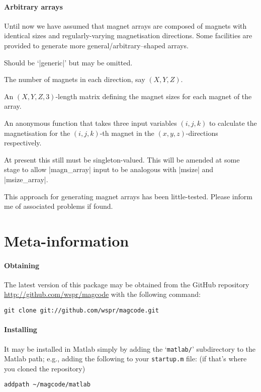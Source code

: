 \documentclass{article}
\begin{document}
\paragraph{Arbitrary arrays}
Until now we have assumed that magnet arrays are composed of magnets with identical sizes and regularly-varying magnetisation directions.
Some facilities are provided to generate more general/arbitrary--shaped arrays.
\begin{description}[noitemsep,font=\ttfamily]
\item[array.type] Should be `|generic|' but may be omitted.
\item[array.mcount] The number of magnets in each direction, say $(X,Y,Z)$.
\item[array.msize_array] An $(X,Y,Z,3)$-length matrix defining the magnet sizes for each magnet of the array.
\item[array.magdir_fn] An anonymous function that takes three input variables $(i,j,k)$ to calculate the magnetisation for the $(i,j,k)$-th magnet in the $(x,y,z)$-directions respectively.
\item[array.magn] At present this still must be singleton-valued. This will be amended at some stage to allow |magn_array| input to be analogous with |msize| and |msize_array|.
\end{description}
This approach for generating magnet arrays has been little-tested. Please inform me of associated problems if found.


\section{Meta-information}\label{meta}

\paragraph{Obtaining}
The latest version of this package may be obtained from the GitHub repository
\url{http://github.com/wspr/magcode} with the following command:
\begin{verbatim}
git clone git://github.com/wspr/magcode.git
\end{verbatim}

\paragraph{Installing}
It may be installed in Matlab simply by adding the `\texttt{matlab/}' subdirectory to the Matlab path; e.g., adding the following to your \texttt{startup.m} file: (if that's where you cloned the repository)
\begin{verbatim}
addpath ~/magcode/matlab
\end{verbatim}
\end{document}
